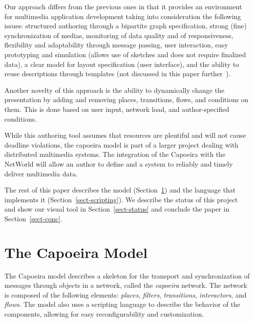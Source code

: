 \documentclass[twocolumn,10pt]{article}
\begin{document}
Our approach differs from the previous ones in that it provides an
environment for multimedia application development taking into
consideration the following issues: structured authoring through a
bipartite graph specification, strong (fine) synchronization of
medias, monitoring of data quality and of responsiveness, flexibility
and adaptability through message passing, user interaction, easy
prototyping and simulation (allows use of sketches and does not
require finalized data), a clear model for layout specification (user
interface), and the ability to reuse descriptions through templates (not discussed in this paper further~\cite{tan:scenario}).

Another novelty of this approach is the ability to dynamically change
the presentation by adding and removing places, transitions, flows,
and conditions on them.  This is done based on user input, network
load, and author-specified conditions.

While this authoring tool assumes that resources are plentiful and
will not cause deadline violations, the capoeira model is part of a
larger project dealing with distributed multimedia systems.  The
integration of the Capoeira with the NetWorld
\cite{mos:mmtrafic,mos:mmqos} will allow an author to define and a
system to reliably and timely deliver multimedia data.

The rest of this paper describes the model (Section~\ref{sect-model})
and the language that implements it  (Section~\ref{sect-scripting}).
We describe the status of this project and show our visual tool in
Section~\ref{sect-status} and conclude the paper in
Section~\ref{sect-conc}. 



\section{The Capoeira Model}
\label{sect-model}

The Capoeira model describes a skeleton for the transport and
synchronization of messages through objects in a network, called the
{\em capoeira} network.  The network is composed of the following
elements: {\em places}, {\em filters}, {\em transitions}, {\em
  interactors}, and {\em flows}.  The model also uses a scripting
language to describe the behavior of the components, allowing for easy
reconfigurability and customization.
\end{document}
